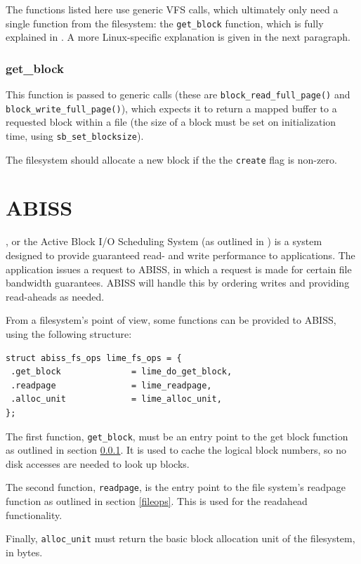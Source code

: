 The functions listed here use generic VFS calls, which ultimately only need a single function from the filesystem: the \texttt{get\_block} function, which is fully explained in \cite{TDotUOS}. A more Linux-specific explanation is given in the next paragraph.

\subsubsection{get\_block}

\label{getblk}

This function is passed to generic calls (these are \texttt{block\_read\_full\_page()} and \texttt{block\_write\_full\_page()}), which expects it to return a mapped buffer to a requested block within a file (the size of a block must be set on initialization time, using \texttt{sb\_set\_blocksize}).

The filesystem should allocate a new block if the the \texttt{create} flag is non-zero.

\section{ABISS}

, or the Active Block I/O Scheduling System (as outlined in \cite{ABISS}) is a system designed to provide guaranteed read- and write performance to applications. The application issues a request to ABISS, in which a request is made for certain file bandwidth guarantees. ABISS will handle this by ordering writes and providing read-aheads as needed.

From a filesystem's point of view, some functions can be provided to ABISS, using the following structure:

\begin{verbatim}
struct abiss_fs_ops lime_fs_ops = {
 .get_block              = lime_do_get_block,
 .readpage               = lime_readpage,
 .alloc_unit             = lime_alloc_unit,
};
\end{verbatim}

The first function, \texttt{get\_block}, must be an entry point to the get block function as outlined in section \ref{getblk}. It is used to cache the logical block numbers, so no disk accesses are needed to look up blocks.

The second function, \texttt{readpage}, is the entry point to the file system's readpage function as outlined in section \ref{fileops}. This is used for the readahead functionality.

Finally, \texttt{alloc\_unit} must return the basic block allocation unit of the filesystem, in bytes.
